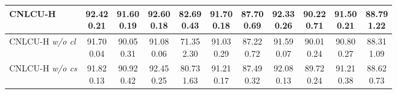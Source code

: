 \documentclass[11pt]{article}
\begin{document}
\begin{table}[!htbp]
\begin{tabular}{l |cc|cc|cc|cc|cc}
			\hline
			CNLCU-H & \makecell{92.42\\ \scriptsize{0.21}} & \makecell{91.60\\ \scriptsize{0.19}} &  \makecell{92.60\\ \scriptsize{0.18}} & \makecell{82.69\\ \scriptsize{0.43}} & \makecell{91.70\\ \scriptsize{0.18}} & \makecell{87.70\\ \scriptsize{0.69}} & \makecell{92.33\\ \scriptsize{0.26}} & \makecell{90.22\\ \scriptsize{0.71}} & \makecell{91.50\\ \scriptsize{0.21}} & \makecell{88.79\\ \scriptsize{1.22}}\\	\hline
			CNLCU-H \textit{w/o cl} & \makecell{91.70\\ \scriptsize{0.04}}	& \makecell{90.05\\ \scriptsize{0.31}} & \makecell{91.08\\ \scriptsize{0.06}} & \makecell{71.35\\ \scriptsize{2.30}} & \makecell{91.03\\ \scriptsize{0.29}} & \makecell{87.22\\ \scriptsize{0.72}} & \makecell{91.59\\ \scriptsize{0.07}} & \makecell{90.01\\ \scriptsize{0.24}} & \makecell{90.80\\ \scriptsize{0.27}} & \makecell{88.31\\ \scriptsize{1.09}}\\	  \hline
			CNLCU-H \textit{w/o cs} & \makecell{91.82\\ \scriptsize{0.13}} & \makecell{90.92\\ \scriptsize{0.42}} & \makecell{92.45\\ \scriptsize{0.25}} & \makecell{80.73\\ \scriptsize{1.63}} & \makecell{91.21\\ \scriptsize{0.17}} & \makecell{87.49\\ \scriptsize{0.32}} & \makecell{92.08\\ \scriptsize{0.13}} & \makecell{89.72\\ \scriptsize{0.24}} & \makecell{91.21\\ \scriptsize{0.38}} & \makecell{88.62\\ \scriptsize{0.73}}\\	  \hline

\end{tabular}
\end{table}
\end{document}
